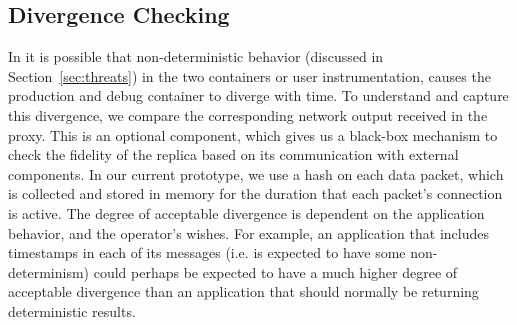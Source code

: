 
\subsection{Divergence Checking}
\label{sec:parikshanDivergenceChecking}

In \parikshan it is possible that non-deterministic behavior (discussed in Section~\ref{sec:threats}) in the two containers or user instrumentation, causes the production and debug container to diverge with time.
To understand and capture this divergence, we compare the corresponding network output received in the proxy.
This is an optional component, which gives us a black-box mechanism to check the fidelity of the replica based on its communication with external components.
In our current prototype, we use a hash on each data packet, which is collected and stored in memory for the duration that each packet's connection is active.
The degree of acceptable divergence is dependent on the application behavior, and the operator's wishes. 
For example, an application that includes timestamps in each of its messages (i.e. is expected to have some non-determinism) could perhaps be expected to have a much higher degree of acceptable divergence than an application that should normally be returning deterministic results.

